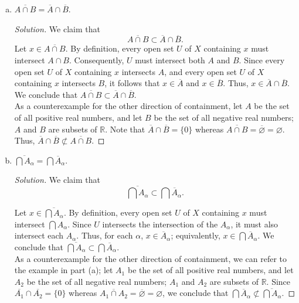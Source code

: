 \documentclass[11pt]{article}
\newcommand{\R}{\mathbb{R}}
\newenvironment{solution}
  {\renewcommand\qedsymbol{$\blacksquare$}\begin{proof}[Solution]}
  {\end{proof}}
\begin{document}
\begin{enumerate}[a)]
	\item $\overline{A \cap B} = \overline{A} \cap \overline{B}$.
	
	\begin{solution}
	We claim that 
	\[
		\boxed{\overline{A \cap B} \subset \overline{A} \cap \overline{B}}.
	\] 
	Let $x \in \overline{A \cap B}$. By definition, every open set $U$ of $X$ containing $x$
	must intersect $A \cap B$. Consequently, $U$ must intersect both $A$ and $B$. Since every open set $U$ of $X$ containing $x$ intersects $A$, and every open set $U$ of $X$ containing $x$ intersects $B$, it follows
	that $x \in \overline{A}$ and $x \in \overline{B}$. Thus, $x \in \overline{A} \cap \overline{B}$. We conclude that $\overline{A \cap B} \subset \overline{A} \cap \overline{B}$. \\

	As a counterexample for the other direction of containment, let $A$ be the set of all positive real numbers, and let $B$ be the set of all negative real numbers; $A$ and $B$ are subsets of $\R$. Note that
	$\overline{A} \cap \overline{B} = \{ 0 \}$ whereas $\overline{A \cap B} = \overline{\varnothing} = \varnothing$. Thus, $\overline{A} \cap \overline{B} \not\subset \overline{A \cap B}$.
	\end{solution}

	\item $\overline{\bigcap A_\alpha} = \bigcap \overline{A}_\alpha$.
	
	\begin{solution}
	We claim that
	\[
		\boxed{\overline{\bigcap A_\alpha} \subset \bigcap \overline{A}_\alpha}.
	\]

	Let $x \in \overline{\bigcap A_\alpha}$. By definition, every open set $U$ of $X$ containing $x$ must intersect $\bigcap A_\alpha$. Since $U$ intersects the intersection of the $A_\alpha$,
	it must also intersect each $A_\alpha$. Thus, for each $\alpha$, $x \in \overline{A}_\alpha$; equivalently, $x \in \bigcap \overline{A}_\alpha$. We conclude that $\overline{\bigcap A_\alpha} \subset \bigcap \overline{A}_\alpha$. \\

	As a counterexample for the other direction of containment, we can refer to the example in part (a); let $A_1$ be the set of all positive real numbers, and let $A_2$ be the set of all negative real numbers; $A_1$ and $A_2$ are subsets of $\R$. 
	Since $\overline{A_1} \cap \overline{A_2} = \{ 0 \}$ whereas $\overline{A_1 \cap A_2} = \overline{\varnothing} = \varnothing$, we conclude that $\bigcap \overline{A}_\alpha \not\subset \overline{\bigcap A_\alpha}$.
	\end{solution}


\end{enumerate}
\end{document}
